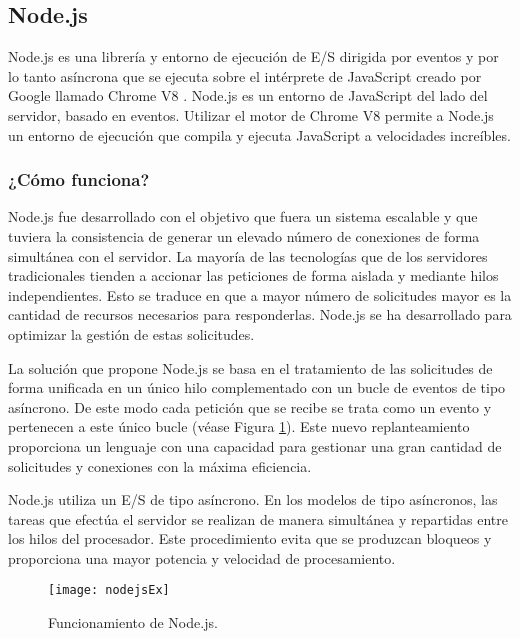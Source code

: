\subsection{Node.js}

Node.js \cite{URL::Nodejs} es una librería y entorno de ejecución de E/S dirigida por eventos y por lo tanto asíncrona que se ejecuta sobre el intérprete de JavaScript creado por Google llamado Chrome V8 \cite{URL::ChromeV8}. Node.js es un entorno de JavaScript del lado del servidor, basado en eventos. Utilizar el motor de Chrome V8 permite a Node.js un entorno de ejecución que compila y ejecuta JavaScript a velocidades increíbles.

\subsubsection{¿Cómo funciona?}

Node.js fue desarrollado con el objetivo que fuera un sistema escalable y que tuviera la consistencia de generar un elevado número de conexiones de forma simultánea con el servidor. La mayoría de las tecnologías que de los servidores tradicionales tienden a accionar las peticiones de forma aislada y mediante hilos independientes. Esto se traduce en que a mayor número de solicitudes mayor es la cantidad de recursos necesarios para responderlas. Node.js se ha desarrollado para optimizar la gestión de estas solicitudes.

La solución que propone Node.js se basa en el tratamiento de las solicitudes de forma unificada en un único hilo complementado con un bucle de eventos de tipo asíncrono. De este modo cada petición que se recibe se trata como un evento y pertenecen a este único bucle (véase Figura \ref{fig:nodejsEx}). Este nuevo replanteamiento proporciona un lenguaje con una capacidad para gestionar una gran cantidad de solicitudes y conexiones con la máxima eficiencia.

Node.js utiliza un E/S de tipo asíncrono. En los modelos de tipo asíncronos, las tareas que efectúa el servidor se realizan de manera simultánea y repartidas entre los hilos del procesador. Este procedimiento evita que se produzcan bloqueos y proporciona una mayor potencia y velocidad de procesamiento.

     
\begin{figure}[h]
    \centering
    \texttt{[image: nodejsEx]}
    \caption{Funcionamiento de Node.js.}
    \label{fig:nodejsEx}
\end{figure}


